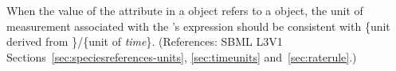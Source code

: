 When the value of the attribute  in a \RateRule object
refers to a \SpeciesReference object, the unit of measurement associated
with the \RateRule's  expression should be consistent with
\{unit derived from \}/\{unit of \emph{time}\}.
(References: SBML L3V1 Sections~\ref{sec:speciesreferences-units},
\ref{sec:timeunits} and~\ref{sec:raterule}.)
